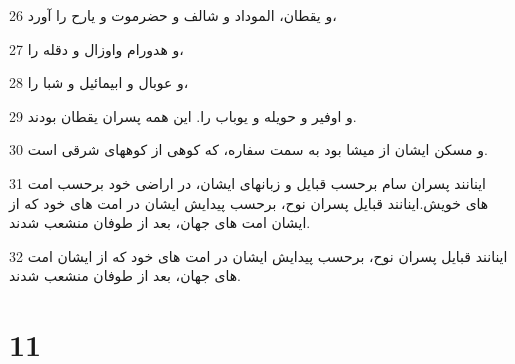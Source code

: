 \par 26 و یقطان، الموداد و شالف و حضرموت و یارح را آورد،
\par 27 و هدورام واوزال و دقله را،
\par 28 و عوبال و ابیمائیل و شبا را،
\par 29 و اوفیر و حویله و یوباب را. این همه پسران یقطان بودند.
\par 30 و مسکن ایشان از میشا بود به سمت سفاره، که کوهی از کوههای شرقی است.
\par 31 اینانند پسران سام برحسب قبایل و زبانهای ایشان، در اراضی خود برحسب امت های خویش.اینانند قبایل پسران نوح، برحسب پیدایش ایشان در امت های خود که از ایشان امت های جهان، بعد از طوفان منشعب شدند.
\par 32 اینانند قبایل پسران نوح، برحسب پیدایش ایشان در امت های خود که از ایشان امت های جهان، بعد از طوفان منشعب شدند.
 
\chapter{11}

